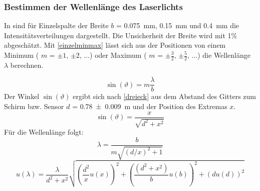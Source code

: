 \documentclass[
	a4paper,
	12pt,
	pagesize,
	ngerman
]{scrartcl}
\begin{document}
	\subsubsection{Bestimmen der Wellenlänge des Laserlichts}
	In  sind für Einzelspalte der Breite $b$ = \SI{0,075}{mm}, \SI{0,15}{mm} und \SI{0,4}{mm} die Intensitätsverteilungen dargestellt. 
	Die Unsicherheit der Breite wird mit 1\% abgeschätzt.
	Mit \cref{einzelminmax} lässt sich aus der Positionen von einem Minimum ( $m$ = $\pm1$, $\pm 2$, ...) oder Maximum ( $m$ = $\pm\frac{3}{2}$, $\pm \frac{5}{2}$, ...) die Wellenlänge $\lambda$ berechnen. 
	
	\begin{equation}
		\sin(\vartheta) = m \frac{\lambda}{b}
		\label{einzelminmax}
	\end{equation}
	Der Winkel $\sin(\vartheta)$ ergibt sich nach \cref{dreieck} aus dem Abstand des Gitters zum Schirm bzw. Sensor $d$ = \SI{0,78 +- 0,009}{m} und der Position des Extremas $x$. 
	\begin{equation}
		\sin(\vartheta) = \frac{x}{\sqrt{d^2 + x^2}}
		\label{dreieck}
	\end{equation}
	Für die Wellenlänge folgt:
	\begin{equation}
		\lambda = \frac{b}{m\sqrt{(d/x)^2 + 1}}
	\end{equation}
	\begin{equation}
	u(\lambda) = \frac{\lambda}{d^2+x^2} \sqrt{\left( \frac{d^2}{x} u(x)\right)^2 + \left( \frac{(d^2+ x^2)}{b}u(b) \right) ^2 + \left( du(d) \right)^2}
	\end{equation}
	
\end{document}
